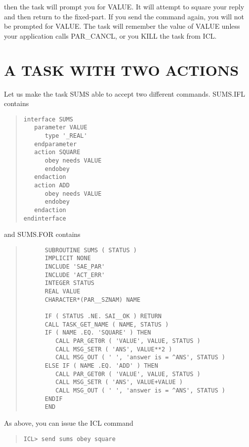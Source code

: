 then the task will prompt you for VALUE. It will attempt to square your 
reply and then return to the fixed-part. If you send the command again,
you will not be prompted for VALUE. The task will remember the value of
VALUE unless your application calls PAR\_CANCL, or you KILL the task
from ICL. 


\section{A TASK WITH TWO ACTIONS}

Let us make the task SUMS able to accept two different commands.
SUMS.IFL contains 

\small \begin{quote} \begin{verbatim}
interface SUMS
   parameter VALUE
      type '_REAL'
   endparameter
   action SQUARE
      obey needs VALUE
      endobey
   endaction
   action ADD
      obey needs VALUE
      endobey
   endaction
endinterface
\end{verbatim} \end{quote} \normalsize

and SUMS.FOR contains

\small \begin{quote} \begin{verbatim}
      SUBROUTINE SUMS ( STATUS )
      IMPLICIT NONE
      INCLUDE 'SAE_PAR'
      INCLUDE 'ACT_ERR'
      INTEGER STATUS
      REAL VALUE
      CHARACTER*(PAR__SZNAM) NAME

      IF ( STATUS .NE. SAI__OK ) RETURN
      CALL TASK_GET_NAME ( NAME, STATUS )
      IF ( NAME .EQ. 'SQUARE' ) THEN
         CALL PAR_GET0R ( 'VALUE', VALUE, STATUS )
         CALL MSG_SETR ( 'ANS', VALUE**2 )
         CALL MSG_OUT ( ' ', 'answer is = ^ANS', STATUS )
      ELSE IF ( NAME .EQ. 'ADD' ) THEN
         CALL PAR_GET0R ( 'VALUE', VALUE, STATUS )
         CALL MSG_SETR ( 'ANS', VALUE+VALUE )
         CALL MSG_OUT ( ' ', 'answer is = ^ANS', STATUS )
      ENDIF
      END
\end{verbatim} \end{quote} \normalsize

As above, you can issue the ICL command

\small \begin{quote} \begin{verbatim}
ICL> send sums obey square
\end{verbatim} \end{quote} \normalsize

